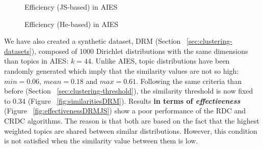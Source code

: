 \begin{figure}[!htb]\centering
   \begin{minipage}{0.49\textwidth}
     \caption{Efficiency (JS-based) in AIES}\label{fig:efficiencyJS}
   \end{minipage}
   \begin {minipage}[c]{0.49\textwidth}
     \caption{Efficiency (He-based) in AIES}\label{fig:efficiencyHe}
   \end{minipage}
\end{figure}


We have also created a synthetic dataset, DRM (Section ~\ref{sec:clustering-datasets}), composed of 1000 Dirichlet distributions with the same dimensions than topics in AIES: $k=44$. Unlike AIES, topic distributions have been randomly generated which imply that the similarity values are not so high: $min=0.06$, $mean=0.18$ and $max=0.61$. Following the same criteria than before (Section ~\ref{sec:clustering-threshold}), the similarity threshold is now fixed to 0.34 (Figure ~\ref{fig:similaritiesDRM}). Results \textbf{in terms of \textit{effectiveness}} (Figure ~\ref{fig:effectivenessDRMJS}) show a poor performance of the RDC and CRDC algorithms. The reason is that both are based on the fact that the highest weighted topics are shared between similar distributions. However, this condition is not satisfied when the similarity value between them is low.


